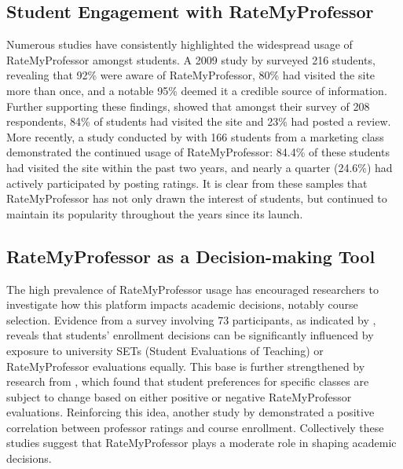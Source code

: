 \documentclass[man, 12pt]{apa7}
\begin{document}
\subsection{Student Engagement with RateMyProfessor}
Numerous studies have consistently highlighted the widespread usage of RateMyProfessor amongst students. A 2009 study by \textcite{davison_how_2009} surveyed 216 students, revealing that 92\% were aware of RateMyProfessor, 80\% had visited the site more than once, and a notable 95\% deemed it a credible source of information. Further supporting these findings, \textcite{bleske-rechek_ratemyprofessors_2010} showed that amongst their survey of 208 respondents, 84\% of students had visited the site and 23\% had posted a review. More recently, a study conducted by \textcite{chiang_students_2017} with 166 students from a marketing class demonstrated the continued usage of RateMyProfessor: 84.4\% of these students had visited the site within the past two years, and nearly a quarter (24.6\%) had actively participated by posting ratings. It is clear from these samples that RateMyProfessor has not only drawn the interest of students, but continued to maintain its popularity throughout the years since its launch.

\subsection{RateMyProfessor as a Decision-making Tool}
The high prevalence of RateMyProfessor usage has encouraged researchers to investigate how this platform impacts academic decisions, notably course selection. Evidence from a survey involving 73 participants, as indicated by \textcite{boswell_effects_2020}, reveals that students' enrollment decisions can be significantly influenced by exposure to university SETs (Student Evaluations of Teaching) or RateMyProfessor evaluations equally. This base is further strengthened by research from \textcite{orlova_ratemyprofessorscom_2021}, which found that student preferences for specific classes are subject to change based on either positive or negative RateMyProfessor evaluations. Reinforcing this idea, another study by \textcite{johnson_i_2014} demonstrated a positive correlation between professor ratings and course enrollment. Collectively these studies suggest that RateMyProfessor plays a moderate role in shaping academic decisions.
\end{document}
